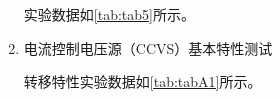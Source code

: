 \documentclass[dvipsnames, svgnames,a4paper,11pt]{article}
\begin{document}
\begin{enumerate}
		
		实验数据如\cref{tab:tab5}所示。
		
		\item 电流控制电压源（CCVS）基本特性测试
		
		转移特性实验数据如\cref{tab:tabA1}所示。
		
		

\end{enumerate}
\end{document}
